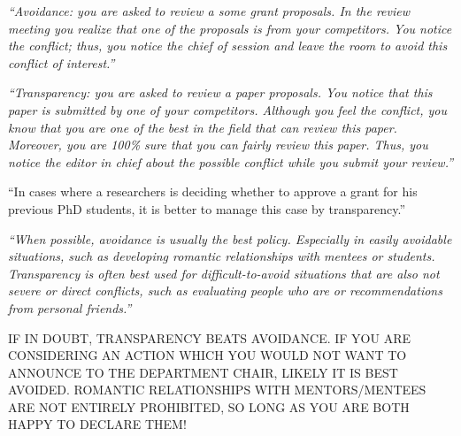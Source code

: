 \documentclass[portrait,11pt]{seminar}
\begin{document}
{\it ``Avoidance: you are asked to review a some grant proposals. In the review meeting you realize that one of the proposals is from your competitors. You notice the conflict; thus, you notice the chief of session and leave the room to avoid this conflict of interest.''}

{\it ``Transparency: you are asked to review a paper proposals. You notice that this paper is submitted by one of your competitors. Although you feel the conflict, you know that you are one of the best in the field that can review this paper. Moreover, you are 100\% sure that you can fairly review this paper. Thus, you notice the editor in chief about the possible conflict while you submit your review.''}


\es
\bs
{\it

``In cases where a researchers is deciding whether to approve a grant for his previous PhD students, it is better to manage this case by transparency.''

}

{\it ``When possible, avoidance is usually the best policy. Especially in easily avoidable situations, such as developing romantic relationships with mentees or students. Transparency is often best used for difficult-to-avoid situations that are also not severe or direct conflicts, such as evaluating people who are or recommendations from personal friends.''}

\vspace{10mm}

IF IN DOUBT, TRANSPARENCY BEATS AVOIDANCE. IF YOU ARE CONSIDERING AN ACTION WHICH YOU WOULD NOT WANT TO ANNOUNCE TO THE DEPARTMENT CHAIR, LIKELY IT IS BEST AVOIDED. ROMANTIC RELATIONSHIPS WITH MENTORS/MENTEES ARE NOT ENTIRELY PROHIBITED, SO LONG AS YOU ARE BOTH HAPPY TO DECLARE THEM!


\es
\bs

\es
\bs
\es
\end{document}
